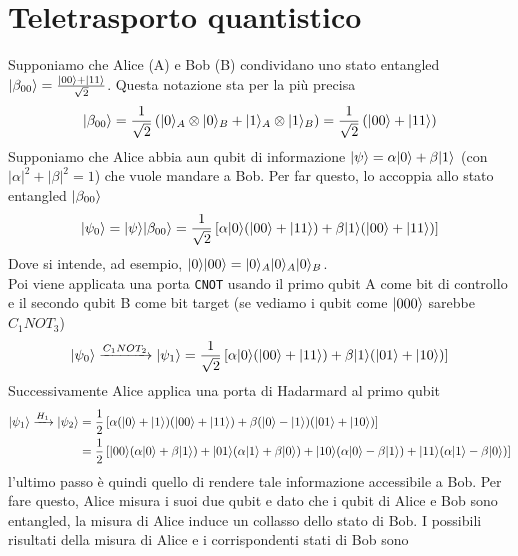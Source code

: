 \documentclass[12pt, a4paper]{report}
\begin{document}
\section{Teletrasporto quantistico}
Supponiamo che Alice (A) e Bob (B) condividano uno stato entangled $| \beta_{00} \rangle = \frac{| 00 \rangle+| 11 \rangle}{\sqrt{2}}$. Questa notazione sta per la più precisa
\begin{equation*}
    | \beta_{00} \rangle = \frac{1}{\sqrt{2}}\left(| 0 \rangle_{A}\otimes| 0 \rangle_{B}+| 1 \rangle_{A}\otimes| 1 \rangle_{B}\right) = \frac{1}{\sqrt{2}}\left(| 00 \rangle+| 11 \rangle\right)
\end{equation*}
Supponiamo che Alice abbia aun qubit di informazione $| \psi \rangle = \alpha| 0 \rangle+\beta| 1 \rangle$ (con $\lvert \alpha \rvert^{2}+\lvert \beta \rvert^{2}=1$) che vuole mandare a Bob. Per far questo, lo accoppia allo stato entangled $| \beta_{00} \rangle$
\begin{equation*}
    | \psi_{0} \rangle = | \psi \rangle| \beta_{00} \rangle = \frac{1}{\sqrt{2}}\left[\alpha| 0 \rangle(| 00 \rangle+| 11 \rangle)+\beta| 1 \rangle(| 00 \rangle+| 11 \rangle)\right]
\end{equation*}
Dove si intende, ad esempio, $| 0 \rangle| 00 \rangle=| 0 \rangle_{A}| 0 \rangle_{A}| 0 \rangle_{B}$.\\
Poi viene applicata una porta \texttt{CNOT} usando il primo qubit A come bit di controllo e il secondo qubit B come bit target (se vediamo i qubit come $| 000 \rangle$ sarebbe $C_{1}NOT_{3}$)
\begin{equation*}
    | \psi_{0} \rangle \xrightarrow{C_{1}NOT_{2}} | \psi_{1} \rangle = \frac{1}{\sqrt{2}}\left[\alpha| 0 \rangle(| 00 \rangle+| 11 \rangle)+\beta| 1 \rangle(| 01 \rangle+| 10 \rangle)\right]
\end{equation*}
Successivamente Alice applica una porta di Hadarmard al primo qubit
\begin{equation*}
    \begin{split}
        | \psi_{1} \rangle \xrightarrow{H_{1}} | \psi_{2} \rangle& = \frac{1}{2}\left[\alpha(| 0 \rangle+| 1 \rangle)(| 00 \rangle+| 11 \rangle)+\beta(| 0 \rangle-| 1 \rangle)(| 01 \rangle+| 10 \rangle)\right] \\ &
        = \frac{1}{2}\left[| 00 \rangle(\alpha| 0 \rangle+\beta| 1 \rangle)+| 01 \rangle(\alpha| 1 \rangle+\beta| 0 \rangle)+| 10 \rangle(\alpha| 0 \rangle-\beta| 1 \rangle)+| 11 \rangle(\alpha| 1 \rangle-\beta| 0 \rangle)\right]
    \end{split}
\end{equation*}
l'ultimo passo è quindi quello di rendere tale informazione accessibile a Bob. Per fare questo, Alice misura i suoi due qubit e dato che i qubit di Alice e Bob sono entangled, la  misura di Alice induce un collasso dello stato di Bob. I possibili risultati della misura di Alice e i corrispondenti stati di Bob sono
\end{document}
